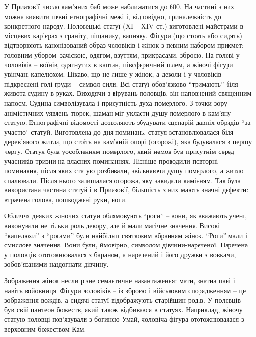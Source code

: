 
У Приазов'ї число кам'яних баб може наближатися до 600. На частині з них можна
виявити певні етнографічні межі і, відповідно, приналежність до конкретного
народу. Половецькі статуї (XI – XIV ст.) виготовлені майстрами в місцевих
кар'єрах з граніту, піщанику, вапняку. Фігури (що стоять або сидять)
відтворюють канонізований образ чоловіків і жінок з певним набором прикмет:
головним убором, зачіскою, одягом, взуттям, прикрасами, зброєю. На голові у
чоловіків – воїнів, одягнутих в каптан, півсферичний шлем, а жіночі фігури
увінчані капелюхом. Цікаво, що не лише у жінок, а деколи і у чоловіків
підкреслені голі груди – символ сили. Всі статуї обов'язково \enquote{тримають} біля
живота судину в руках. Виходячи з вірувань половців, він наповнений священним
напоєм. Судина символізувала і присутність духа померлого. З точки зору
анімістичних уявлень тюрок, шаман міг укласти душу померлого в кам'яну статую.
Етнографічні відомості дозволяють збудувати сценарій давніх обрядів \enquote{за участю}
статуй.  Виготовлена до дня поминань, статуя встановлювалася біля дерев'яного
житла, що стоїть на кам'яній опорі (огорожі), яка будувалася в першу чергу.
Статуя була уособленням померлого, який немов був присутнім серед учасників
тризни на власних поминаннях. Пізніше проводили повторні поминання, після яких
статую розбивали, звільняючи душу померлого, а житло спалювали. Після нього
залишалася огорожа, яку закидали камінням. Так була використана частина статуй
і в Приазов'ї, більшість з них мають значні дефекти: втрачена голова,
пошкоджені руки, ноги.


Обличчя деяких жіночих статуй облямовують \enquote{роги} – вони, як вважають учені,
виконували не тільки роль декору, але й мали магічне значення. Високі
\enquote{капелюхи} з \enquote{рогами} були найбільш святковим вбранням жінок. \enquote{Роги} мали і
смислове значення. Вони були, ймовірно, символом дівчини-нареченої. Наречена у
половців ототожнювалася з бараном, а наречений і його дружки з вовками,
зобов'язаними наздогнати дівчину.

Зображення жінок несли різне семантичне навантаження: мати, знатна пані і
навіть войовниця. Фігури чоловіків – із зброєю і військовим спорядженням – це
зображення вождів, а сидячі статуї відображують старійшин родів. У половців був
свій пантеон божеств, який також відбивався в статуях. Наприклад, жіночу статую
половці пов'язували з богинею Умай,  чоловіча фігура ототожнювалася з
верховним божеством Кам.

